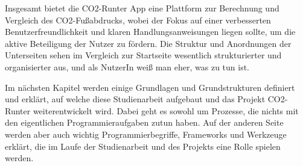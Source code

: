 Insgesamt bietet die CO2-Runter App eine Plattform zur Berechnung und Vergleich des CO2-Fußabdrucks, wobei der Fokus auf einer verbesserten Benutzerfreundlichkeit und klaren Handlungsanweisungen liegen sollte, um die aktive Beteiligung der Nutzer zu fördern.
Die Struktur und Anordnungen der Unterseiten sehen im Vergleich zur Startseite wesentlich strukturierter und organisierter aus, und als NutzerIn weiß man eher, was zu tun ist.

Im nächsten Kapitel werden einige Grundlagen und Grundstrukturen definiert und erklärt, auf welche diese Studienarbeit aufgebaut und das Projekt CO2-Runter weiterentwickelt wird.
Dabei geht es sowohl um Prozesse, die nichts mit den eigentlichen Programmieraufgaben zutun haben.
Auf der anderen Seite werden aber auch wichtig Programmierbegriffe, Frameworks und Werkzeuge erklärt, die im Laufe der Studienarbeit und des Projekts eine Rolle spielen werden.
